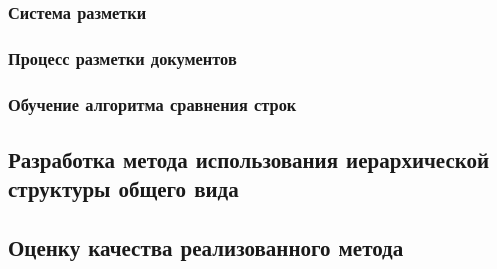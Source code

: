 \subsubsection{Система разметки}

\subsubsection{Процесс разметки документов}

\subsubsection{Обучение алгоритма сравнения строк}


\subsection{Разработка метода использования иерархической структуры общего вида}
\label{subsec:usemethod}

\subsection{Оценку качества реализованного метода}
\label{subsec:evaluation}